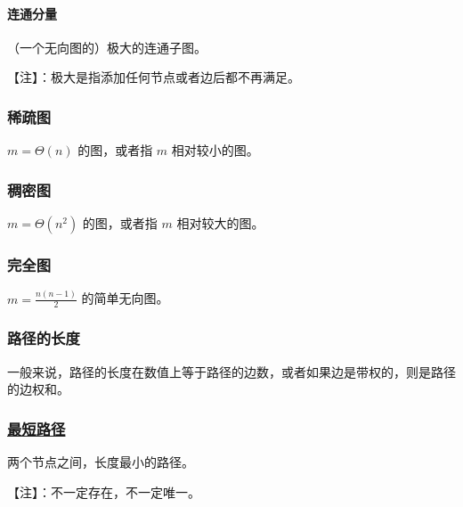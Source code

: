\paragraph{连通分量}

（一个无向图的）极大的连通子图。

【注】：极大是指添加任何节点或者边后都不再满足。

\subsubsection{稀疏图}

$m = \Theta(n)$ 的图，或者指 $m$ 相对较小的图。

\subsubsection{稠密图}

$m = \Theta(n^2)$ 的图，或者指 $m$ 相对较大的图。

\subsubsection{完全图}

$m = \frac{n(n-1)}{2}$ 的简单无向图。

\subsubsection{路径的长度}

一般来说，路径的长度在数值上等于路径的边数，或者如果边是带权的，则是路径的边权和。

\subsubsection{\href{/graph/shortest-path}{最短路径}}

两个节点之间，长度最小的路径。

【注】：不一定存在，不一定唯一。
